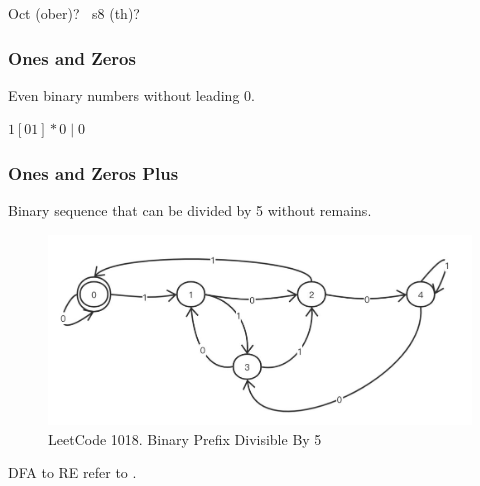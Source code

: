 \documentclass[a4paper]{exam}
\begin{document}
\begin{solution}
  Oct (ober)? $\ $ s8 (th)?
\end{solution}

\subsubsection{Ones and Zeros}
Even binary numbers without leading 0.
\begin{solution}
  $1[01] * 0 \mid 0$
\end{solution}
\subsubsection{Ones and Zeros Plus}
Binary sequence that can be divided by 5 without remains.
\begin{figure}[h]
  \centering
  \includegraphics[width=\linewidth]{./img/leading_five.png}
  \caption{LeetCode 1018. Binary Prefix Divisible By 5}
\end{figure}
\begin{solution}
  DFA to RE refer to \cite{dfatoregex}.
\end{solution}

\end{document}
